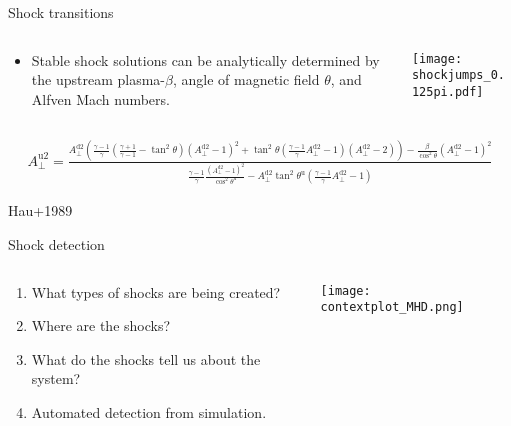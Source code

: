 \documentclass[10pt,aspectratio=169,usenames,dvipsnames]{beamer}
\begin{document}
\begin{frame}{Shock transitions}
\begin{columns}
\begin{column}{0.4\textwidth}
\begin{itemize}
    \item Stable shock solutions can be analytically determined by the upstream plasma-$\beta$, angle of magnetic field $\theta$, and Alfven Mach numbers.
\end{itemize}
\end{column}
\begin{column}{0.6\textwidth}
\texttt{[image: shockjumps\_0.125pi.pdf]}
\end{column}
\end{columns}
\begin{gather}
    A_\perp ^{\text{u}2} = \frac{ A_\perp ^{\text{d}2} \left( \frac{\gamma-1}{\gamma} \left( \frac{\gamma+1}{\gamma -1} -\tan ^2 \theta \right) \left(A_\perp ^{\text{d}2} -1 \right) ^2 + \tan ^2 \theta  \left( \frac{\gamma-1}{\gamma} A_\perp ^{\text{d}2} -1 \right) \left(A_\perp ^{\text{d}2} -2 \right) \right) - \frac{\beta }{ \cos ^2 \theta } \left( A_\perp ^{\text{d}2} -1 \right) ^2 } { \frac{\gamma -1}{\gamma} \frac{\left( A_\perp ^{\text{d}2}-1 \right) ^2}{ \cos ^2 \theta ^{\text{u}}} - A_ \perp ^{\text{d}2} \tan ^2 \theta ^{\text{u}} \left( \frac{\gamma -1}{\gamma} A_\perp ^{\text{d}2} -1 \right) } \label{eqn:hau}
\end{gather}
\begin{flushright}
{\small Hau+1989}
\end{flushright}
\end{frame}

\begin{frame}{Shock detection}
\begin{columns}
\begin{column}{0.4\textwidth}
\begin{enumerate}
\item What types of shocks are being created?
\item Where are the shocks?
\item What do the shocks tell us about the system?
\item Automated detection from simulation.
\end{enumerate}
\end{column}
\begin{column}{0.6\textwidth}
\texttt{[image: contextplot\_MHD.png]}
\end{column}
\end{columns}
\end{frame}
\end{document}
